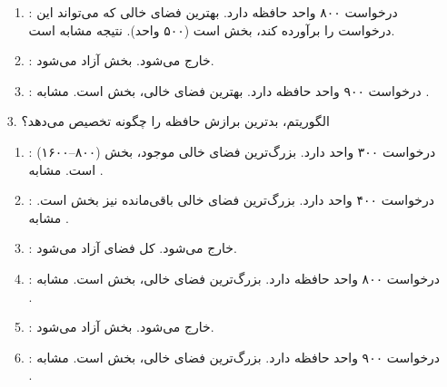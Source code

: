 \begin{enumerate}
\begin{qsolve}
\begin{enumerate}
			\item {}: درخواست ۸۰۰ واحد حافظه دارد. بهترین فضای خالی که می‌تواند این درخواست را برآورده کند، بخش  است (۵۰۰ واحد). نتیجه مشابه  است.
			
			\item {}: خارج می‌شود. بخش  آزاد می‌شود.
			
			\item {}: درخواست ۹۰۰ واحد حافظه دارد. بهترین فضای خالی، بخش  است. مشابه .
		\end{enumerate}
	\end{qsolve}
	
	\item [3.] الگوریتم، بدترین برازش حافظه را چگونه تخصیص می‌دهد؟
	\begin{qsolve}
		\begin{enumerate}
			\item {}: درخواست ۳۰۰ واحد دارد. بزرگ‌ترین فضای خالی موجود، بخش  (۸۰۰–۱۶۰۰) است. مشابه .
			
			\item {}: درخواست ۴۰۰ واحد دارد. بزرگ‌ترین فضای خالی باقی‌مانده نیز بخش  است. مشابه .
			
			\item {}: خارج می‌شود. کل فضای  آزاد می‌شود.
			
			\item {}: درخواست ۸۰۰ واحد حافظه دارد. بزرگ‌ترین فضای خالی، بخش  است. مشابه .
			
			\item {}: خارج می‌شود. بخش  آزاد می‌شود.
			
			\item {}: درخواست ۹۰۰ واحد حافظه دارد. بزرگ‌ترین فضای خالی، بخش  است. مشابه .
		\end{enumerate}
	\end{qsolve}
	
\end{enumerate}














